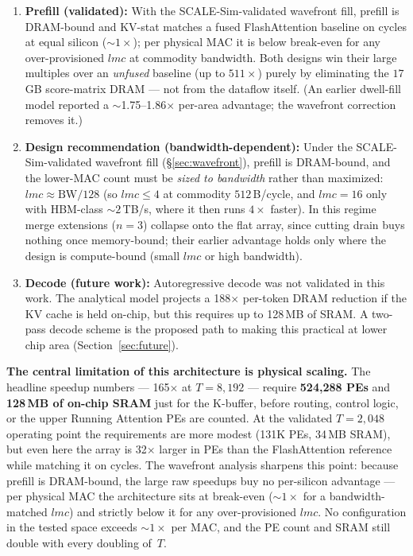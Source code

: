 \documentclass[11pt]{article}
\begin{document}
\begin{enumerate}[noitemsep]
    \item \textbf{Prefill (validated):} With the SCALE-Sim-validated
          wavefront fill, prefill is DRAM-bound and KV-stat matches a
          fused FlashAttention baseline on cycles at equal silicon
          (\(\sim\!1\times\)); per physical MAC it is below break-even
          for any over-provisioned \(lmc\) at commodity bandwidth.
          Both designs win their large multiples over an \emph{unfused}
          baseline (up to \(511\times\)) purely by eliminating the
          \(17\,\)GB score-matrix DRAM --- not from the dataflow itself.
          (An earlier dwell-fill model reported a \(\sim\)1.75--1.86$\times$
          per-area advantage; the wavefront correction removes it.)

    \item \textbf{Design recommendation (bandwidth-dependent):} Under the
          SCALE-Sim-validated wavefront fill (\S\ref{sec:wavefront}), prefill is
          DRAM-bound, and the lower-MAC count must be \emph{sized to bandwidth}
          rather than maximized: \(lmc \approx \text{BW}/128\) (so \(lmc \le 4\) at
          commodity \(512\,\)B/cycle, and \(lmc = 16\) only with HBM-class
          \(\sim\!2\,\)TB/s, where it then runs \(4\times\) faster). In this regime
          merge extensions (\(n = 3\)) collapse onto the flat array, since cutting
          drain buys nothing once memory-bound; their earlier advantage holds only
          where the design is compute-bound (small \(lmc\) or high bandwidth).

    \item \textbf{Decode (future work):} Autoregressive decode was not
          validated in this work.
          The analytical model projects a 188$\times$ per-token DRAM
          reduction if the KV cache is held on-chip, but this requires
          up to 128\,MB of SRAM.
          A two-pass decode scheme is the proposed path to making
          this practical at lower chip area (Section~\ref{sec:future}).
\end{enumerate}

\textbf{The central limitation of this architecture is physical scaling.}
The headline speedup numbers --- 165$\times$ at \(T = 8{,}192\) ---
require \textbf{524{,}288 PEs} and \textbf{128\,MB of on-chip SRAM}
just for the K-buffer, before routing, control logic, or the upper
Running Attention PEs are counted.
At the validated \(T = 2{,}048\) operating point the requirements
are more modest (131K PEs, 34\,MB SRAM), but even here the array
is 32$\times$ larger in PEs than the FlashAttention reference while
matching it on cycles. The wavefront analysis sharpens this point:
because prefill is DRAM-bound, the large raw speedups buy no
per-silicon advantage --- per physical MAC the architecture sits at
break-even (\(\sim\!1\times\) for a bandwidth-matched \(lmc\)) and
strictly below it for any over-provisioned \(lmc\). No configuration
in the tested space exceeds \(\sim\!1\times\) per MAC, and the PE count
and SRAM still double with every doubling of~\(T\).
\end{document}
